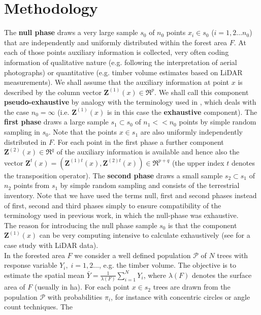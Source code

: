 \documentclass[a4paper,12pt,leqno, titlepage]{article}
\begin{document}
\section{Methodology}
The \textbf{null phase} draws a very large sample $s_0$ of $n_0$ points
$x_{i}\in{s_0}$ ($i=1,2\ldots n_0$) that are independently and uniformly distributed
within the forest area $F$. At each of those points auxiliary
information is collected, very often coding information of qualitative nature
(e.g. following the  interpretation of aerial photographs) or quantitative (e.g. timber volume estimates  based on LiDAR measurements). We shall assume that the auxiliary information at point $x$
is described by the column vector $\pmb{Z}^{(1)}(x)\in{\Re^p}$. We shall call this component \textbf{pseudo-exhaustive} by analogy with the terminology used in \cite{mandallaz3}, which deals with the case $n_0=\infty$ (i.e. $\pmb{Z}^{(1)}(x)$ is in this case the \textbf{exhaustive} component). The \textbf{first phase} draws a large sample $s_1 \subset s_0$ of $n_1 <<n_0$ points by simple random sampling in $s_0$. Note that the points $x\in{s_1}$ are also uniformly independently distributed in $F$. For each point in the first phase a further component $\pmb{Z}^{(2)}(x)\in{\Re^q}$ of the auxiliary information is available and hence also the vector $\pmb{Z}^t(x)=(\pmb{Z}^{(1)t}(x),\pmb{Z}^{(2)t}(x))\in{\Re^{p+q}}$ (the upper index $t$ denotes the transposition operator). The \textbf{second phase} draws a small sample $s_2\subset{s_1}$ of
$n_2$ points from $s_1$ by simple random sampling and consists of the terrestrial inventory. Note that we have used the terms null, first and second phases instead of first, second and third phases simply to ensure compatibility of the terminology used in previous work, in which the null-phase was exhaustive.\\
The reason for introducing the null phase sample $s_0$ is that the component $\pmb{Z}^{(1)}(x)$ can be very computing intensive to calculate exhaustively (see \cite{mandallaz3} for a case study with LiDAR data).\\
In the forested area $F$ we consider a well defined population $ \mathcal{P}$ of $N$ trees with response variable
 $Y_i,\;i=1,2 \ldots$, e.g. the timber volume.  The objective is to estimate the spatial mean  $\bar{Y}=\frac{1}{\lambda(F)}\sum_{i=1}^NY_i$, where $\lambda(F)$ denotes the surface area of $F$ (usually in ha). For each point $x\in{s_2}$ trees are drawn from the population $\mathcal{P}$ with probabilities $\pi_i$, for instance with concentric circles or angle count techniques. The
\end{document}
